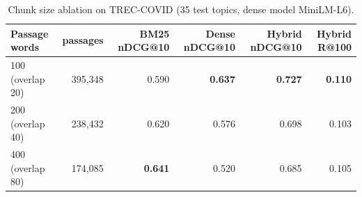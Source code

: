 \begin{table}[t]
\centering\small
\begin{tabular}{lrrrrr}
\toprule
Passage words & passages & BM25 nDCG@10 & Dense nDCG@10 & Hybrid nDCG@10 & Hybrid R@100 \\
\midrule
100 (overlap 20) & 395,348 & 0.590 & \textbf{0.637} & \textbf{0.727} & \textbf{0.110} \\
200 (overlap 40) & 238,432 & 0.620 & 0.576 & 0.698 & 0.103 \\
400 (overlap 80) & 174,085 & \textbf{0.641} & 0.520 & 0.685 & 0.105 \\
\bottomrule
\end{tabular}
\caption{Chunk size ablation on TREC-COVID (35 test topics, dense model MiniLM-L6).}
\label{tab:ablation_chunk_trec}
\end{table}

